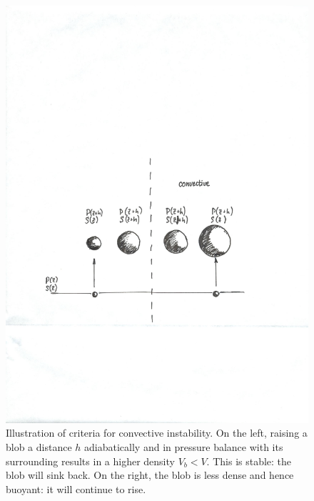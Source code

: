 \begin{figure}[htbp]
\centerline{\includegraphics[width=\textwidth]{convective}}
\caption{\label{f.convective-schematic}Illustration of criteria for convective instability.  On the left, raising a blob a distance $h$ adiabatically and in pressure balance with its surrounding results in a higher density $V_{b} < V$.  This is stable: the blob will sink back.  On the right, the blob is less dense and hence buoyant: it will continue to rise.}
\end{figure}

